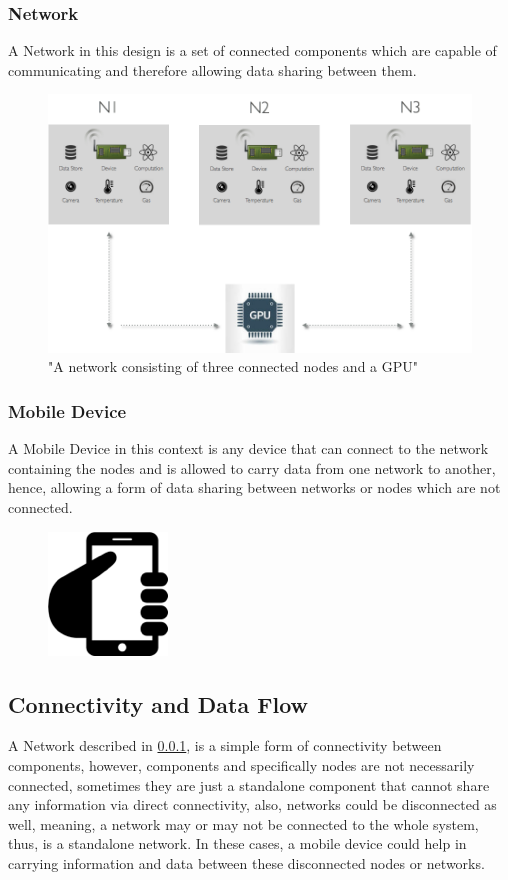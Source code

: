 \subsubsection{Network}
\label{subsub:network}
A Network in this design is a set of connected components which are capable of communicating and therefore allowing data sharing between them.
\begin{figure}[H]
	\centering
	\includegraphics[scale=0.4]{images/network.png}
	\caption{"A network consisting of three connected nodes and a GPU"}
	\label{fig:network}
\end{figure}

\subsubsection{Mobile Device}
A Mobile Device in this context is any device that can connect to the network containing the nodes and is allowed to  carry data from one network to another, hence, allowing a form of data sharing between networks or nodes which are not connected.

\begin{figure}[H]
	\centering
	\includegraphics[scale=0.3]{images/mobile.png}
	\label{fig:mobile}
\end{figure}



\subsection{Connectivity and Data Flow}
A Network described in \ref{subsub:network}, is a simple form of connectivity between components, however, components and specifically nodes are not necessarily connected, sometimes they are just a standalone component that cannot share any information via direct connectivity, also, networks could be disconnected as well, meaning, a network may or may not be connected to the whole system, thus, is a standalone network. In these cases, a mobile device could help in carrying information and data between these disconnected nodes or networks. 

